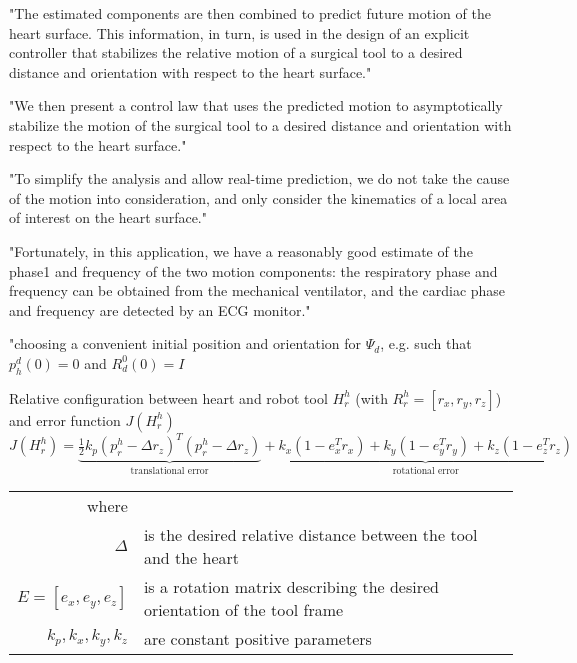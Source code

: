 "The estimated components are then combined to predict future motion of the heart surface. This information, in turn, is used in the design of an explicit controller that stabilizes the relative motion of a surgical tool to a desired distance and orientation with respect to the heart surface."

"We then present a control law that uses the predicted motion to asymptotically stabilize the motion of the surgical tool to a desired distance and orientation with respect to the heart surface."

"To simplify the analysis and allow real-time prediction, we do not take the cause of the motion into consideration, and only consider the kinematics of a local area of interest on the heart surface."

"Fortunately, in this application, we have a reasonably good estimate of the phase1 and frequency of the two motion components: the respiratory phase and frequency can be obtained from the mechanical ventilator, and the cardiac phase and frequency are detected by an ECG monitor."

"choosing a convenient initial position and orientation for $\Psi_d$, e.g. such that $p^d_h(0)=0$ and $R^0_d(0) = I$

Relative configuration between heart and robot tool $H^h_r$ (with $R^h_r =[r_x, r_y, r_z]$) and error function $J(H^h_r)$
\begin{equation}
J(H^h_r) = \underbrace{\tfrac{1}{2}k_p (p^h_r-\Delta r_z)^T(p^h_r-\Delta r_z)}_\text{translational error} + \underbrace{k_x (1-e_x^T r_x) + k_y (1-e_y^T r_y) + k_z (1-e_z^T r_z)}_\text{rotational error}
\end{equation}
\begin{tabular}{rl}
	where &\\
	$\Delta$ & is the desired relative distance between the tool and the heart\\
	$E=[e_x,e_y,e_z]$ & is a rotation matrix describing the desired orientation of the tool frame\\
	$k_p,k_x,k_y,k_z$ & are constant positive parameters\\
\end{tabular}\\

